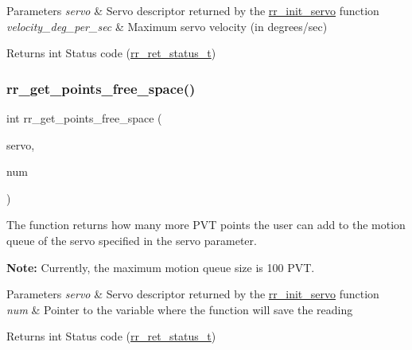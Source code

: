 \begin{DoxyParams}{Parameters}
{\em servo} & Servo descriptor returned by the \hyperlink{group___common_ga0adb313a3eeb8a4399431e940a1f3e9e}{rr\+\_\+init\+\_\+servo} function \\
\hline
{\em velocity\+\_\+deg\+\_\+per\+\_\+sec} & Maximum servo velocity (in degrees/sec) \\
\hline
\end{DoxyParams}
\begin{DoxyReturn}{Returns}
int Status code (\hyperlink{api_8h_a92d5be5038abcf89837faf85a08debdc}{rr\+\_\+ret\+\_\+status\+\_\+t}) 
\end{DoxyReturn}
\mbox{\label{group___servo__info_gaafd0d575c047ed269664fbc760a640c1}} 
\subsubsection{\texorpdfstring{rr\+\_\+get\+\_\+points\+\_\+free\+\_\+space()}{rr\_get\_points\_free\_space()}}
{\footnotesize\ttfamily int rr\+\_\+get\+\_\+points\+\_\+free\+\_\+space (\begin{DoxyParamCaption}\item[{const \hyperlink{structrr__servo__t}{rr\+\_\+servo\+\_\+t} $\ast$}]{servo,  }\item[{uint32\+\_\+t $\ast$}]{num }\end{DoxyParamCaption})}



The function returns how many more P\+VT points the user can add to the motion queue of the servo specified in the \textquotesingle{}servo\textquotesingle{} parameter. 

{\bfseries Note\+:} Currently, the maximum motion queue size is 100 P\+VT.


\begin{DoxyParams}{Parameters}
{\em servo} & Servo descriptor returned by the \hyperlink{group___common_ga0adb313a3eeb8a4399431e940a1f3e9e}{rr\+\_\+init\+\_\+servo} function \\
\hline
{\em num} & Pointer to the variable where the function will save the reading \\
\hline
\end{DoxyParams}
\begin{DoxyReturn}{Returns}
int Status code (\hyperlink{api_8h_a92d5be5038abcf89837faf85a08debdc}{rr\+\_\+ret\+\_\+status\+\_\+t}) 
\end{DoxyReturn}
\mbox{\label{group___servo__info_gae6ed290842e08d349dd86bb1264e6a17}} 
